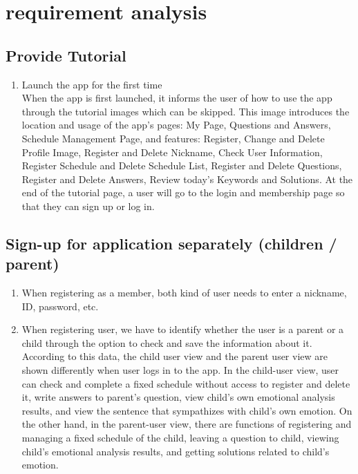 \documentclass[conference]{IEEEtran}
\begin{document}
\section{\large{requirement analysis}}

\subsection{Provide Tutorial}
\begin{enumerate}
  \item Launch the app for the first time \\
    When the app is first launched, it informs the user of how to use the app through the tutorial images which can be skipped. This image introduces the location and usage of the app's pages: My Page, Questions and Answers, Schedule Management Page, and features: Register, Change and Delete Profile Image, Register and Delete Nickname, Check User Information, Register Schedule and Delete Schedule List, Register and Delete Questions, Register and Delete Answers, Review today's Keywords and Solutions. At the end of the tutorial page, a user will go to the login and membership page so that they can sign up or log in.
  
\end{enumerate}

\subsection{Sign-up for application separately (children / parent)}

\begin{enumerate}
  \item When registering as a member, both kind of user needs to enter a nickname, ID, password, etc.
  
  \item When registering user, we have to identify whether the user is a parent or a child through the option to check and save the information about it. According to this data, the child user view and the parent user view are shown differently when user logs in to the app. In the child-user view, user can check and complete a fixed schedule without access to register and delete it, write answers to parent’s question, view child’s own emotional analysis results, and view the sentence that sympathizes with child's own emotion. On the other hand, in the parent-user view, there are functions of registering and managing a fixed schedule of the child, leaving a question to child, viewing child's emotional analysis results, and getting solutions related to child’s emotion.
\end{enumerate}
\end{document}
